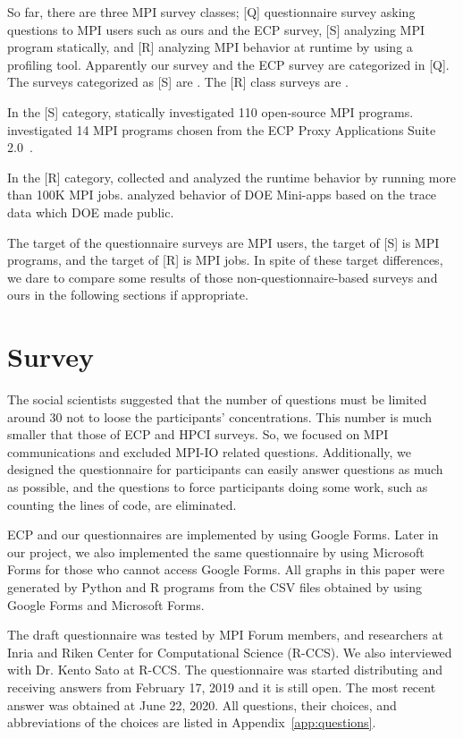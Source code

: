 \documentclass[conference,10pt,letterpaper]{IEEEtran}
\begin{document}
So far, there are three MPI survey classes; [Q] questionnaire
survey asking questions to MPI users such as ours and the ECP survey,
[S] analyzing MPI program statically, and [R] analyzing MPI behavior
at runtime by using a profiling tool. Apparently our survey and the
ECP survey are categorized in [Q]. The surveys categorized as [S] are
\cite{10.1145/3295500.3356176, Sultana2018UnderstandingTU}. The [R]
class surveys are
\cite{10.1109/SC.2018.00033,10.1007/978-3-319-58667-0_12}. 

In the [S] category, \cite{10.1145/3295500.3356176} statically
investigated 110 open-source MPI
programs. \cite{Sultana2018UnderstandingTU} investigated 14 MPI
programs chosen from the ECP Proxy Applications Suite
2.0~\cite{osti_1482870}. 

In the [R] category, \cite{10.1109/SC.2018.00033} collected and
analyzed the runtime behavior by running more than 100K MPI
jobs. \cite{10.1007/978-3-319-58667-0_12} analyzed behavior of DOE
Mini-apps based on the trace data which DOE made public.

The target of the questionnaire surveys are MPI users, the target of
[S] is MPI programs, and the target of [R] is MPI jobs. In spite of
these target differences, we dare to compare some results of those
non-questionnaire-based surveys and ours in the 
following sections if appropriate.

\section{Survey}

%
%
The social scientists suggested that the number of questions must be
limited around 30 not to loose the participants' concentrations.  
This number is much smaller that those of ECP and HPCI surveys. So, we
focused on MPI communications and excluded MPI-IO related
questions. Additionally, we designed the questionnaire for
participants can easily answer questions as much as possible, and
the questions to force participants doing some work, such as
counting the lines of code, are eliminated. 

ECP and our questionnaires are implemented by using Google Forms. Later
in our project, we also implemented the same questionnaire by using
Microsoft Forms for those who cannot access Google Forms. All graphs
in this paper were generated by Python and R programs from the CSV files
obtained by using Google Forms and Microsoft Forms.

The draft questionnaire was tested by MPI Forum members, and
researchers at Inria and Riken Center for Computational Science
(R-CCS). We also interviewed with Dr. Kento Sato at R-CCS.
The questionnaire was started distributing and receiving answers from
February 17, 2019 and it is still open. The most recent answer was
obtained at June 22, 2020. All questions, their choices, and
abbreviations of the choices are listed in
Appendix~\ref{app:questions}.
\end{document}
